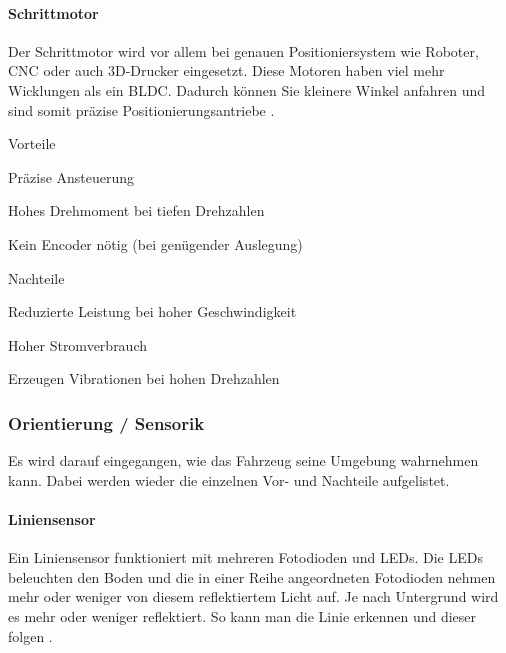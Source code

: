 \documentclass[../main.tex]{subfiles}
\begin{document}
\paragraph{Schrittmotor}

Der Schrittmotor wird vor allem bei genauen Positioniersystem wie Roboter, CNC oder auch 3D-Drucker eingesetzt. Diese Motoren haben viel mehr Wicklungen als ein BLDC. Dadurch können Sie kleinere Winkel anfahren und sind somit präzise Positionierungsantriebe \cite{schrittmotor}. 

\begin{minipage}[t]{0.48\textwidth}
\begin{items}
  \item [Vorteile]
  \item Präzise Ansteuerung
  \item Hohes Drehmoment bei tiefen Drehzahlen
  \item Kein Encoder nötig (bei genügender Auslegung)
\end{items}
\end{minipage}
\hfill
\begin{minipage}[t]{0.48\textwidth}
\begin{items}
  \item [Nachteile]
  \item Reduzierte Leistung bei hoher Geschwindigkeit
  \item Hoher Stromverbrauch
  \item Erzeugen Vibrationen bei hohen Drehzahlen
\end{items}
\end{minipage}

\subsubsection{Orientierung / Sensorik}

Es wird darauf eingegangen, wie das Fahrzeug seine Umgebung wahrnehmen kann. Dabei werden wieder die einzelnen Vor- und Nachteile aufgelistet.

\paragraph{Liniensensor}
Ein Liniensensor funktioniert mit mehreren Fotodioden und LEDs. Die LEDs beleuchten den Boden und die in einer Reihe angeordneten Fotodioden nehmen mehr oder weniger von diesem reflektiertem Licht auf. Je nach Untergrund wird es mehr oder weniger reflektiert. So kann man die Linie erkennen und dieser folgen \cite{liniensensor}.
 
\end{document}
